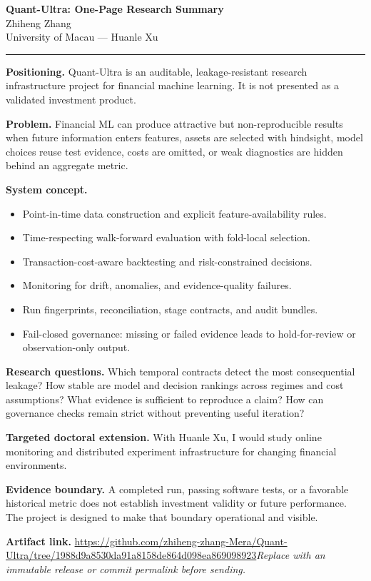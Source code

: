 \documentclass[11pt]{article}
\newcommand{\ApplicantName}{Zhiheng Zhang}
\newcommand{\ApplicantGitHub}{\url{https://github.com/zhiheng-zhang-Mera/Quant-Ultra/tree/1988d9a8530da91a8158de864d098ea869098923}}
\begin{document}
\begin{center}
{\LARGE\bfseries Quant-Ultra: One-Page Research Summary}\\[0.25em]
{\large \ApplicantName}\\
University of Macau --- Huanle Xu
\end{center}
\vspace{0.35em}\hrule\vspace{0.65em}

\textbf{Positioning.} Quant-Ultra is an auditable, leakage-resistant research infrastructure project for financial machine learning. It is not presented as a validated investment product.

\textbf{Problem.} Financial ML can produce attractive but non-reproducible results when future information enters features, assets are selected with hindsight, model choices reuse test evidence, costs are omitted, or weak diagnostics are hidden behind an aggregate metric.

\textbf{System concept.}
\begin{itemize}
\item Point-in-time data construction and explicit feature-availability rules.
\item Time-respecting walk-forward evaluation with fold-local selection.
\item Transaction-cost-aware backtesting and risk-constrained decisions.
\item Monitoring for drift, anomalies, and evidence-quality failures.
\item Run fingerprints, reconciliation, stage contracts, and audit bundles.
\item Fail-closed governance: missing or failed evidence leads to hold-for-review or observation-only output.
\end{itemize}

\textbf{Research questions.} Which temporal contracts detect the most consequential leakage? How stable are model and decision rankings across regimes and cost assumptions? What evidence is sufficient to reproduce a claim? How can governance checks remain strict without preventing useful iteration?

\textbf{Targeted doctoral extension.} With Huanle Xu, I would study online monitoring and distributed experiment infrastructure for changing financial environments.

\textbf{Evidence boundary.} A completed run, passing software tests, or a favorable historical metric does not establish investment validity or future performance. The project is designed to make that boundary operational and visible.

\textbf{Artifact link.} \ApplicantGitHub\quad \textit{Replace with an immutable release or commit permalink before sending.}
\end{document}

